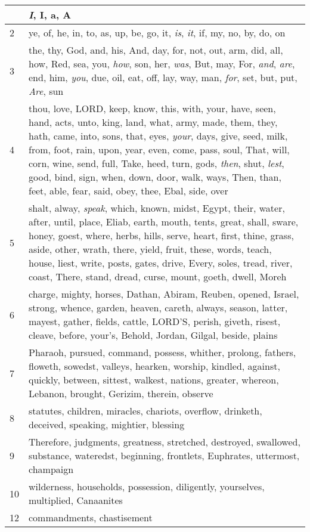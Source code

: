 \begin{longtable}{l|p{3.75in}}
\hline \hline
\endlastfoot
1 & \emph{I}, I, a, A \\ \hline
2 & ye, of, he, in, to, as, up, be, go, it, \emph{is}, \emph{it}, if, my, no, by, do, on \\ \hline
3 & the, thy, God, and, his, And, day, for, not, out, arm, did, all, how, Red, sea, you, \emph{how}, son, her, \emph{was}, But, may, For, \emph{and}, \emph{are}, end, him, \emph{you}, due, oil, eat, off, lay, way, man, \emph{for}, set, but, put, \emph{Are}, sun \\ \hline
4 & thou, love, LORD, keep, know, this, with, your, have, seen, hand, acts, unto, king, land, what, army, made, them, they, hath, came, into, sons, that, eyes, \emph{your}, days, give, seed, milk, from, foot, rain, upon, year, even, come, pass, soul, That, will, corn, wine, send, full, Take, heed, turn, gods, \emph{then}, shut, \emph{lest}, good, bind, sign, when, down, door, walk, ways, Then, than, feet, able, fear, said, obey, thee, Ebal, side, over \\ \hline
5 & shalt, alway, \emph{speak}, which, known, midst, Egypt, their, water, after, until, place, Eliab, earth, mouth, tents, great, shall, sware, honey, goest, where, herbs, hills, serve, heart, first, thine, grass, aside, other, wrath, there, yield, fruit, these, words, teach, house, liest, write, posts, gates, drive, Every, soles, tread, river, coast, There, stand, dread, curse, mount, goeth, dwell, Moreh \\ \hline
6 & charge, mighty, horses, Dathan, Abiram, Reuben, opened, Israel, strong, whence, garden, heaven, careth, always, season, latter, mayest, gather, fields, cattle, LORD'S, perish, giveth, risest, cleave, before, your's, Behold, Jordan, Gilgal, beside, plains \\ \hline
7 & Pharaoh, pursued, command, possess, whither, prolong, fathers, floweth, sowedst, valleys, hearken, worship, kindled, against, quickly, between, sittest, walkest, nations, greater, whereon, Lebanon, brought, Gerizim, therein, observe \\ \hline
8 & statutes, children, miracles, chariots, overflow, drinketh, deceived, speaking, mightier, blessing \\ \hline
9 & Therefore, judgments, greatness, stretched, destroyed, swallowed, substance, wateredst, beginning, frontlets, Euphrates, uttermost, champaign \\ \hline
10 & wilderness, households, possession, diligently, yourselves, multiplied, Canaanites \\ \hline
12 & commandments, chastisement \\ \hline
\end{longtable}






